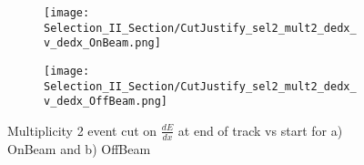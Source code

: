 \begin{figure}[h!]
\centering
\begin{subfigure}[t]{0.25\textwidth}
    \centering
\texttt{[image: Selection\_II\_Section/CutJustify\_sel2\_mult2\_dedx\_v\_dedx\_OnBeam.png]}
    \caption{ }
  \end{subfigure} 
  \hspace{1mm}
  \begin{subfigure}[t]{0.25\textwidth}
    \centering
    \texttt{[image: Selection\_II\_Section/CutJustify\_sel2\_mult2\_dedx\_v\_dedx\_OffBeam.png]}
    \caption{ }
  \end{subfigure} 

\caption{ Multiplicity 2 event cut on $\frac{dE}{dx}$ at end of track vs start for a) OnBeam and b) OffBeam }
\label{fig:cutjust_sel2_onbeam_mult2_dedx_v_dedx}
\end{figure}


